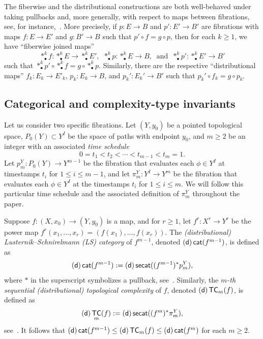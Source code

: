 \documentclass[amscd,amssymb,verbatim,10pt]{amsart}
\numberwithin{equation}{section}
\theoremstyle{plain}
\theoremstyle{definition}
\DeclareMathOperator{\cat}{{\mathsf{cat}}}
\DeclareMathOperator{\TC}{{\mathsf{TC}}}
\DeclareMathOperator{\secat}{{\mathsf{secat}}}
\newcommand{\sd}{{(\sf {d})}}
\begin{document}
The fiberwise and the distributional constructions are both well-behaved under taking pullbacks and, more generally, with respect to maps between fibrations, see, for instance,~\cite{Sch,CLOT,DJ,KW,KW2,JO}. More precisely, if $p\colon E\to B$ and $p'\colon E'\to B'$ are fibrations with maps $f\colon E\to E'$ and $g\colon B'\to B$ such that $p'\circ f=g\circ p$, then for each $k\ge 1$, we have ``fiberwise joined maps'' 
\[
\ast^k_{\bullet}f\colon \ast^k_\bullet E\to \ast^k_\bullet E',\ \ \ast^k_{\bullet}p\colon \ast^k_\bullet E\to B,\  \text{ and } \ \ast^k_{\bullet}p'\colon \ast^k_\bullet E'\to B'
\]
such that $\ast^k_\bullet p'\circ \ast^k_\bullet f=g\circ \ast^k_\bullet p$. Similarly, there are the respective ``distributional maps'' $f_k\colon E_k\to E'_k$, $p_k\colon E_k\to B$, and $p_k'\colon E_k'\to B'$ such that $p_k'\circ f_k=g\circ p_k$.



\subsection{Categorical and complexity-type invariants}
Let us consider two specific fibrations. Let $(Y,y_0)$ be a pointed topological space, $P_0(Y)\subset Y^I$ be the space of paths with endpoint $y_0$, and $m\ge 2$ be an integer with an associated \emph{time schedule} 
\[
0=t_1<t_2<\cdots<t_{m-1}<t_m=1.
\]
Let $p^Y_m\colon P_0(Y)\to Y^{m-1}$ be the fibration that evaluates each $\phi\in Y^I$ at timestamps $t_i$ for $1\le i \le m-1$, and let $\pi_m^Y\colon Y^I\to Y^m$ be the fibration that evaluates each $\phi\in Y^I$ at the timestamps $t_i$ for $1\le i \le m$. We will follow this particular time schedule and the associated definition of $\pi^Y_m$ throughout the paper.

Suppose $f\colon (X,x_0)\to (Y,y_0)$ is a map, and for $r\ge 1$, let $f^r\colon X^r\to Y^r$ be the power map $f^r(x_1,\dots,x_r)=(f(x_1),\dots,f(x_r))$. The \emph{(distributional) Lusternik--Schnirelmann (LS) category} of $f^{m-1}$, denoted $\sd\cat(f^{m-1})$, is defined as 
\[
\sd\cat(f^{m-1}):=\sd\secat((f^{m-1})^*p^Y_m), 
\]
where $*$ in the superscript symbolizes a pullback, see~\cite{Jam,CLOT,DJ,KW,Dr,Ja1}. Similarly, the $m$\emph{-th sequential (distributional) topological complexity} of $f$, denoted $\sd\TC_m(f)$, is defined as 
\[
\sd\TC_m(f):=\sd\secat((f^m)^*\pi_m^Y),
\]
see~\cite{Far,Rud,BGRT,Sco,Kua,DJ,KW,Ja1,Ja2}. It follows that $\sd\cat(f^{m-1})\le\sd\TC_m(f)\le\sd\cat(f^m)$ for each $m\ge 2$.
\end{document}
